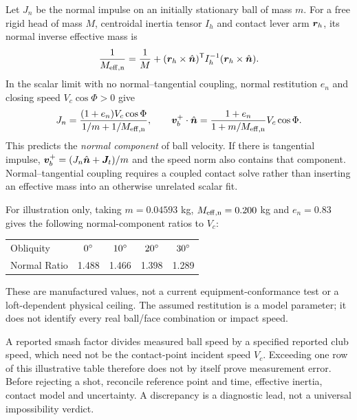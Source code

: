 Let $J_n$ be the normal impulse on an initially stationary ball of mass $m$.
For a free rigid head of mass $M$, centroidal inertia tensor $I_h$ and contact lever arm $\bm{r}_h$, its normal inverse effective mass is
\begin{equation}
\label{eq:impacteffectivemass}
\frac{1}{M_{\rm eff,n}}=\frac{1}{M}
 +(\bm{r}_h\times\hat{\bm{n}})^{\mathsf T}I_h^{-1}
   (\bm{r}_h\times\hat{\bm{n}}).
\end{equation}
In the scalar limit with no normal--tangential coupling, normal restitution $e_n$ and closing speed $V_c\cos\Phi>0$ give~\cite{cochranstobbs,penner2003}
\begin{equation}
\label{eq:ballspeed}
J_n=\frac{(1+e_n)V_c\cos\Phi}{1/m+1/M_{\rm eff,n}},
\qquad
\bm{v}_b^+\cdot\hat{\bm{n}}
 =\frac{1+e_n}{1+m/M_{\rm eff,n}}V_c\cos\Phi.
\end{equation}
This predicts the \emph{normal component} of ball velocity.
If there is tangential impulse, $\bm{v}_b^+=(J_n\hat{\bm{n}}+\bm{J}_t)/m$ and the speed norm also contains that component.
Normal--tangential coupling requires a coupled contact solve rather than inserting an effective mass into an otherwise unrelated scalar fit.

For illustration only, taking $m=0.04593$ kg, $M_{\rm eff,n}=0.200$ kg and $e_n=0.83$ gives the following normal-component ratios to $V_c$:
\begin{center}
\small
\begin{tabular}{@{}lcccc@{}}
\toprule
Obliquity & $0\si{\degree}$ & $10\si{\degree}$ & $20\si{\degree}$ & $30\si{\degree}$ \\
Normal Ratio & 1.488 & 1.466 & 1.398 & 1.289 \\
\bottomrule
\end{tabular}
\end{center}
These are manufactured values, not a current equipment-conformance test or a loft-dependent physical ceiling.
The assumed restitution is a model parameter; it does not identify every real ball/face combination or impact speed.

\begin{keypoint}
A reported smash factor divides measured ball speed by a specified reported club speed, which need not be the contact-point incident speed $V_c$.
Exceeding one row of this illustrative table therefore does not by itself prove measurement error.
Before rejecting a shot, reconcile reference point and time, effective inertia, contact model and uncertainty.
A discrepancy is a diagnostic lead, not a universal impossibility verdict.
\end{keypoint}

